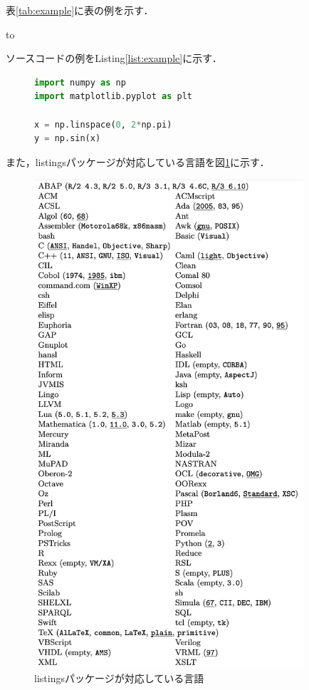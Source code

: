 表\ref{tab:example}に表の例を示す．

\begin{table}[tb]
    \caption{表の例}
    \label{tab:example}
    \hbox to
\end{table}

ソースコードの例をListing\ref{list:example}に示す．

\begin{figure}[tb]
    \begin{lstlisting}[language=Python, caption={ソースコードの例}, label={list:example}]
import numpy as np
import matplotlib.pyplot as plt

x = np.linspace(0, 2*np.pi)
y = np.sin(x)
\end{lstlisting}
\end{figure}


また，listingsパッケージが対応している言語を図\ref{fig:language}に示す\cite{listing}．


\begin{figure}[tb]
    \centering
    \includegraphics[clip,width=10cm]{assets/appendix/language.png}
    \caption{listingsパッケージが対応している言語}
    \label{fig:language}
\end{figure}